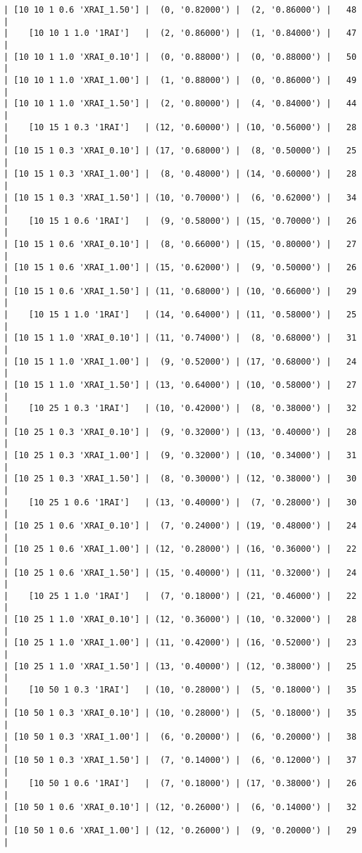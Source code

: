\documentclass{article}
\begin{document}
\begin{verbatim}
| [10 10 1 0.6 'XRAI_1.50'] |  (0, '0.82000') |  (2, '0.86000') |   48  |
|    [10 10 1 1.0 '1RAI']   |  (2, '0.86000') |  (1, '0.84000') |   47  |
| [10 10 1 1.0 'XRAI_0.10'] |  (0, '0.88000') |  (0, '0.88000') |   50  |
| [10 10 1 1.0 'XRAI_1.00'] |  (1, '0.88000') |  (0, '0.86000') |   49  |
| [10 10 1 1.0 'XRAI_1.50'] |  (2, '0.80000') |  (4, '0.84000') |   44  |
|    [10 15 1 0.3 '1RAI']   | (12, '0.60000') | (10, '0.56000') |   28  |
| [10 15 1 0.3 'XRAI_0.10'] | (17, '0.68000') |  (8, '0.50000') |   25  |
| [10 15 1 0.3 'XRAI_1.00'] |  (8, '0.48000') | (14, '0.60000') |   28  |
| [10 15 1 0.3 'XRAI_1.50'] | (10, '0.70000') |  (6, '0.62000') |   34  |
|    [10 15 1 0.6 '1RAI']   |  (9, '0.58000') | (15, '0.70000') |   26  |
| [10 15 1 0.6 'XRAI_0.10'] |  (8, '0.66000') | (15, '0.80000') |   27  |
| [10 15 1 0.6 'XRAI_1.00'] | (15, '0.62000') |  (9, '0.50000') |   26  |
| [10 15 1 0.6 'XRAI_1.50'] | (11, '0.68000') | (10, '0.66000') |   29  |
|    [10 15 1 1.0 '1RAI']   | (14, '0.64000') | (11, '0.58000') |   25  |
| [10 15 1 1.0 'XRAI_0.10'] | (11, '0.74000') |  (8, '0.68000') |   31  |
| [10 15 1 1.0 'XRAI_1.00'] |  (9, '0.52000') | (17, '0.68000') |   24  |
| [10 15 1 1.0 'XRAI_1.50'] | (13, '0.64000') | (10, '0.58000') |   27  |
|    [10 25 1 0.3 '1RAI']   | (10, '0.42000') |  (8, '0.38000') |   32  |
| [10 25 1 0.3 'XRAI_0.10'] |  (9, '0.32000') | (13, '0.40000') |   28  |
| [10 25 1 0.3 'XRAI_1.00'] |  (9, '0.32000') | (10, '0.34000') |   31  |
| [10 25 1 0.3 'XRAI_1.50'] |  (8, '0.30000') | (12, '0.38000') |   30  |
|    [10 25 1 0.6 '1RAI']   | (13, '0.40000') |  (7, '0.28000') |   30  |
| [10 25 1 0.6 'XRAI_0.10'] |  (7, '0.24000') | (19, '0.48000') |   24  |
| [10 25 1 0.6 'XRAI_1.00'] | (12, '0.28000') | (16, '0.36000') |   22  |
| [10 25 1 0.6 'XRAI_1.50'] | (15, '0.40000') | (11, '0.32000') |   24  |
|    [10 25 1 1.0 '1RAI']   |  (7, '0.18000') | (21, '0.46000') |   22  |
| [10 25 1 1.0 'XRAI_0.10'] | (12, '0.36000') | (10, '0.32000') |   28  |
| [10 25 1 1.0 'XRAI_1.00'] | (11, '0.42000') | (16, '0.52000') |   23  |
| [10 25 1 1.0 'XRAI_1.50'] | (13, '0.40000') | (12, '0.38000') |   25  |
|    [10 50 1 0.3 '1RAI']   | (10, '0.28000') |  (5, '0.18000') |   35  |
| [10 50 1 0.3 'XRAI_0.10'] | (10, '0.28000') |  (5, '0.18000') |   35  |
| [10 50 1 0.3 'XRAI_1.00'] |  (6, '0.20000') |  (6, '0.20000') |   38  |
| [10 50 1 0.3 'XRAI_1.50'] |  (7, '0.14000') |  (6, '0.12000') |   37  |
|    [10 50 1 0.6 '1RAI']   |  (7, '0.18000') | (17, '0.38000') |   26  |
| [10 50 1 0.6 'XRAI_0.10'] | (12, '0.26000') |  (6, '0.14000') |   32  |
| [10 50 1 0.6 'XRAI_1.00'] | (12, '0.26000') |  (9, '0.20000') |   29  |

\end{verbatim}
\end{document}
